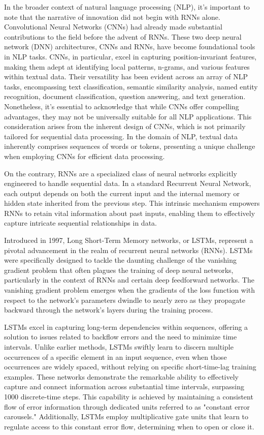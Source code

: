 \documentclass[conference]{IEEEtran}
\begin{document}
In the broader context of natural language processing (NLP), it's important to note that the narrative of innovation did not begin with RNNs alone. Convolutional Neural Networks (CNNs) had already made substantial contributions to the field before the advent of RNNs. These two deep neural network (DNN) architectures, CNNs and RNNs, have become foundational tools in NLP tasks. CNNs, in particular, excel in capturing position-invariant features, making them adept at identifying local patterns, n-grams, and various features within textual data. Their versatility has been evident across an array of NLP tasks, encompassing text classification, semantic similarity analysis, named entity recognition, document classification, question answering, and text generation. Nonetheless, it's essential to acknowledge that while CNNs offer compelling advantages, they may not be universally suitable for all NLP applications. This consideration arises from the inherent design of CNNs, which is not primarily tailored for sequential data processing. In the domain of NLP, textual data inherently comprises sequences of words or tokens, presenting a unique challenge when employing CNNs for efficient data processing.


On the contrary, RNNs are a specialized class of neural networks explicitly engineered to handle sequential data. In a standard Recurrent Neural Network, each output depends on both the current input and the internal memory or hidden state inherited from the previous step. This intrinsic mechanism empowers RNNs to retain vital information about past inputs, enabling them to effectively capture intricate sequential relationships in data. 




Introduced in 1997, Long Short-Term Memory networks, or LSTMs, represent a pivotal advancement in the realm of recurrent neural networks (RNNs). LSTMs were specifically designed to tackle the daunting challenge of the vanishing gradient problem that often plagues the training of deep neural networks, particularly in the context of RNNs and certain deep feedforward networks. The vanishing gradient problem emerges when the gradients of the loss function with respect to the network's parameters dwindle to nearly zero as they propagate backward through the network's layers during the training process.


LSTMs excel in capturing long-term dependencies within sequences, offering a solution to issues related to backflow errors and the need to minimize time intervals. Unlike earlier methods, LSTMs swiftly learn to discern multiple occurrences of a specific element in an input sequence, even when those occurrences are widely spaced, without relying on specific short-time-lag training examples. These networks demonstrate the remarkable ability to effectively capture and connect information across substantial time intervals, surpassing 1000 discrete-time steps. This capability is achieved by maintaining a consistent flow of error information through dedicated units referred to as "constant error carousels." Additionally, LSTMs employ multiplicative gate units that learn to regulate access to this constant error flow, determining when to open or close it.
\end{document}
